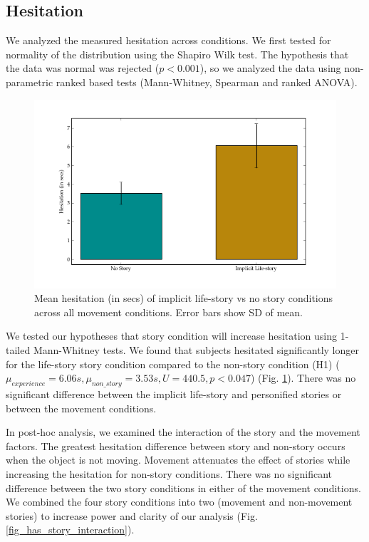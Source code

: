  \subsection{Hesitation}

We analyzed the measured hesitation across conditions. We first tested for normality of the distribution using the Shapiro Wilk test. The hypothesis that the data was normal was rejected ($p < 0.001$), so we analyzed the data using non-parametric ranked based tests (Mann-Whitney, Spearman and ranked ANOVA). 




   \begin{figure}[thpb]
      \centering
      \includegraphics[width=4.6in]{figures/hexbug/story_hesitation.png}
      \caption{Mean hesitation (in secs) of implicit life-story vs no story conditions across all movement conditions. Error bars show SD of mean.}
      \label{fig_story_hesitation}
   \end{figure}
   



We tested our hypotheses that story condition will increase hesitation using 1-tailed Mann-Whitney tests.  We found that subjects hesitated significantly longer for the life-story story condition compared to the non-story condition (H1) ($\mu_{experience}=6.06s, \mu_{non\_story}=3.53s, U=440.5, p<0.047$) (Fig. \ref{fig_story_hesitation}). There was no significant difference between the implicit life-story and personified stories or between the movement conditions.



In post-hoc analysis, we examined the interaction of the story and the movement factors. The greatest hesitation difference between story and non-story occurs when the object is not moving. Movement attenuates the effect of stories while increasing the hesitation for non-story conditions. There was no significant difference between the two story conditions in either of the movement conditions. We combined the four story conditions into two (movement and non-movement stories) to increase power and clarity of our analysis (Fig. \ref{fig_has_story_interaction}).




